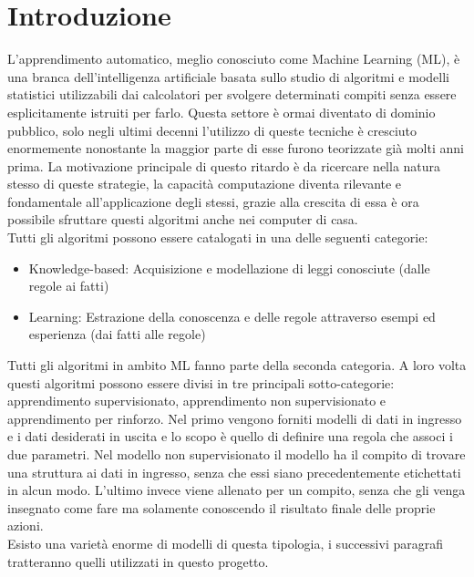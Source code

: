 \documentclass[%
    corpo=12pt,
    twoside,
    oldstyle,
    autoretitolo,
    greek,
    evenboxes,
]{toptesi}
\begin{document}
\section{Introduzione}
L'apprendimento automatico, meglio conosciuto come Machine Learning (ML), è una branca dell'intelligenza artificiale basata sullo studio di algoritmi e modelli statistici utilizzabili dai calcolatori per svolgere determinati compiti senza essere esplicitamente istruiti per farlo. Questa settore è ormai diventato di dominio pubblico, solo negli ultimi decenni l'utilizzo di queste tecniche è cresciuto enormemente nonostante la maggior parte di esse furono teorizzate già molti anni prima. La motivazione principale di questo ritardo è da ricercare nella natura stesso di queste strategie, la capacità computazione diventa rilevante e fondamentale all'applicazione degli stessi, grazie alla crescita di essa è ora possibile sfruttare questi algoritmi anche nei computer di casa.\\
Tutti gli algoritmi possono essere catalogati in una delle seguenti categorie:
\begin{itemize}
  \item Knowledge-based: Acquisizione e modellazione di leggi conosciute (dalle regole ai fatti)
  \item Learning: Estrazione della conoscenza e delle regole attraverso esempi ed esperienza (dai fatti alle regole)
\end{itemize}
Tutti gli algoritmi in ambito ML fanno parte della seconda categoria. A loro volta questi algoritmi possono essere divisi in tre principali sotto-categorie: apprendimento supervisionato, apprendimento non supervisionato e apprendimento per rinforzo. Nel primo vengono forniti modelli di dati in ingresso e i dati desiderati in uscita e lo scopo è quello di definire una regola che associ i due parametri. Nel modello non supervisionato il modello ha il compito di trovare una struttura ai dati in ingresso, senza che essi siano precedentemente etichettati in alcun modo. L'ultimo invece viene allenato per un compito, senza che gli venga insegnato come fare ma solamente conoscendo il risultato finale delle proprie azioni.\\
Esisto una varietà enorme di modelli di questa tipologia, i successivi paragrafi tratteranno quelli utilizzati in questo progetto.
\end{document}
